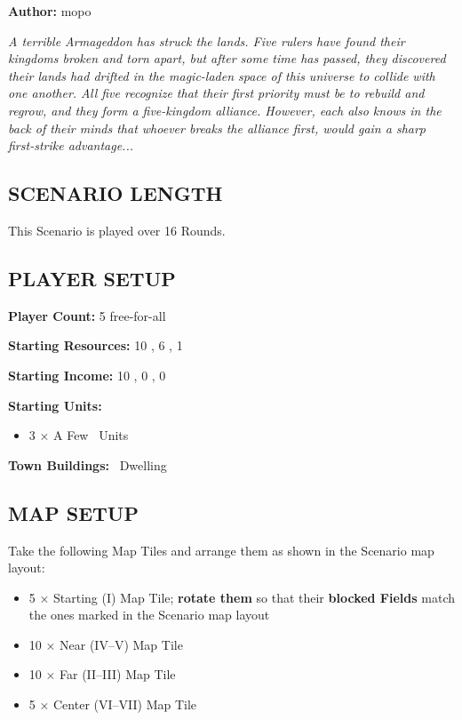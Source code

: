 
\begin{multicols}{2}

\textbf{Author:} mopo

\textit{A terrible Armageddon has struck the lands. Five rulers have found their kingdoms broken and torn apart, but after some time has passed, they discovered their lands had drifted in the magic-laden space of this universe to collide with one another. All five recognize that their first priority must be to rebuild and regrow, and they form a five-kingdom alliance. However, each also knows in the back of their minds that whoever breaks the alliance first, would gain a sharp first-strike advantage...}

\subsection*{\MakeUppercase{Scenario Length}}
This Scenario is played over 16 Rounds.

\subsection*{\MakeUppercase{Player Setup}}
\textbf{Player Count:} 5 free-for-all

\textbf{Starting Resources:} 10 , 6 , 1 

\textbf{Starting Income:} 10 , 0 , 0 

\textbf{Starting Units:}
\begin{itemize}
  \item 3 × A Few \bronze\ Units
\end{itemize}

\textbf{Town Buildings:} \bronze\ Dwelling

\subsection*{\MakeUppercase{Map Setup}}
Take the following Map Tiles and arrange them as shown in the Scenario map layout:

\begin{itemize}
  \item 5 × Starting (I) Map Tile; \textbf{rotate them} so that their \textbf{blocked Fields} match the ones marked in the Scenario map layout
  \item 10 × Near (IV--V) Map Tile
  \item 10 × Far (II--III) Map Tile
  \item 5 × Center (VI--VII) Map Tile
\end{itemize}


\end{multicols}
